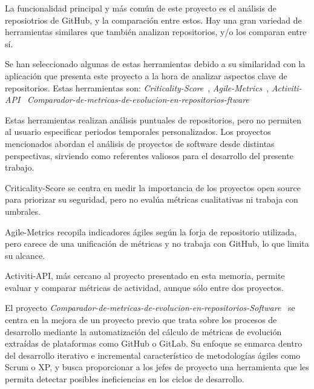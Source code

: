 
La funcionalidad principal y más común de este proyecto es el análisis de reposiotrios de GitHub, y la comparación entre estos. Hay una gran variedad de herramientas similares que también analizan repositorios, y/o los comparan entre sí.

Se han seleccionado algunas de estas herramientas debido a su similaridad con la aplicación que presenta este proyecto a la hora de analizar aspectos clave de repositorios. Estas herramientas son: 
\textit{Criticality-Score}~\cite{ossf_criticality_score}, 
\textit{Agile-Metrics}~\cite{dagrisa_agile_metrics}, 
\textit{Activiti-API}~\cite{dba0010_activiti_api}  
\textit{Comparador-de-metricas-de-evolucion-en-repositorios-ftware}~\cite{joaquin_gm_gii_o_ma}

Estas herramientas realizan análisis puntuales de repositorios, pero no permiten al usuario especificar periodos temporales personalizados. Los proyectos mencionados abordan el análisis de proyectos de software desde distintas perspectivas, sirviendo como referentes valiosos para el desarrollo del presente trabajo.

Criticality-Score se centra en medir la importancia de los proyectos open source para priorizar su seguridad, pero no evalúa métricas cualitativas ni trabaja con umbrales.

Agile-Metrics recopila indicadores ágiles según la forja de repositorio utilizada, pero carece de una unificación de métricas y no trabaja con GitHub, lo que limita su alcance.

Activiti-API, más cercano al proyecto presentado en esta memoria, permite evaluar y comparar métricas de actividad, aunque sólo entre dos proyectos.

El proyecto \textit{Comparador-de-metricas-de-evolucion-en-repositorios-Software}~\cite{joaquin_gm_gii_o_ma} se centra en la mejora de un proyecto previo que trata sobre los procesos de desarrollo mediante la automatización del cálculo de métricas de evolución extraídas de plataformas como GitHub o GitLab. Su enfoque se enmarca dentro del desarrollo iterativo e incremental característico de metodologías ágiles como Scrum o XP, y busca proporcionar a los jefes de proyecto una herramienta que les permita detectar posibles ineficiencias en los ciclos de desarrollo.

